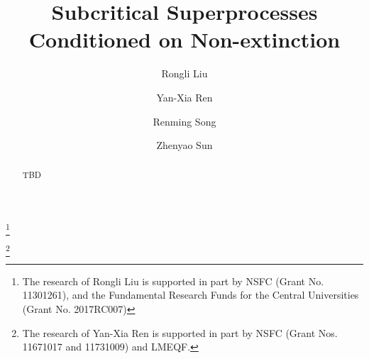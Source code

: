 \documentclass[12pt,a4paper]{amsart}
\numberwithin{equation}{section}
\theoremstyle{plain}
\theoremstyle{definition}
\theoremstyle{remark}
\begin{document}
\title {Subcritical Superprocesses Conditioned on Non-extinction}
\author[R. Liu]{Rongli Liu}
\address{Rongli Liu\\ Mathematics and Applied Mathematics\\ Beijing jiaotong University\\ Beijing 100044\\ P. R. China}
\thanks{The research of Rongli Liu is supported in part by NSFC (Grant No. 11301261), and the Fundamental Research Funds for the Central Universities (Grant No.  2017RC007)}
\author[Y.-X. Ren]{Yan-Xia Ren}
\address{Yan-Xia Ren\\ LMAM School of Mathematical Sciences \& Center for
Statistical Science\\ Peking University\\ Beijing 100871\\ P. R. China}
\thanks{The research of Yan-Xia Ren is supported in part by NSFC (Grant Nos. 11671017 and 11731009)  and LMEQF.}
\author[R. Song]{Renming Song}
\address{Renming Song\\ Department of Mathematics\\ University of Illinois at Urbana-Champaign \\ Urbana \\ IL 61801\\ USA}
\author[Z. Sun]{Zhenyao Sun}
\address{Zhenyao Sun\\ Faculty of Industrial Engineering and Management \\ Technion, Isreal Institute of Technology \\ Haifa 3200003\\ Isreal}
\begin{abstract}
\begin{comment}
Suppose that $E$ is a locally compact separable metric space, and  that  $X =\{(X_t)_{t\geq 0}; (\mathbb P_\mu)_{\mu \in \mathcal M_f(E)}\}$  is a subcritical superprocess, where $\mathcal M_f(E)$ is the space of all finite Borel measures on $E$. Under some conditions on the mean semigroup of $X$, we prove that the the $Q$ process of $X$ exists, and they have equilibrium probability if and only if the moment condition $\int_El(x)\nu({\mathrm d}x)<\infty$ is satisfied.
We also show that the equilibrium probability is a size-biased measure of the Yaglom distribution.
\end{comment}
    TBD
\end{abstract}
\maketitle
\end{document}

